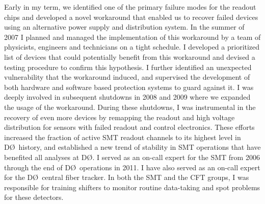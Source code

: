 \documentclass[amsmath,amssymb]{revtex4}
\def\dzero{D\O}
\begin{document}
Early in my term, we identified one of the primary failure modes for
the readout chips and developed a novel workaround that enabled us to
recover failed devices using an alternative power supply and
distribution system.  In the summer of 2007 I planned and managed the
implementation of this workaround by a team of physicists, engineers
and technicians on a tight schedule.  I developed a prioritized list
of devices that could potentially benefit from this workaround and
devised a testing procedure to confirm this hypothesis. I further
identified an unexpected vulnerability that the workaround induced,
and supervised the development of both hardware and software based
protection systems to guard against it.  I was deeply
involved in subsequent shutdowns in 2008 and 2009 where we expanded
the usage of the workaround.  During these shutdowns, I was
instrumental in the recovery of even more devices by remapping the
readout and high voltage distribution for sensors with failed readout
and control electronics.  These efforts increased the fraction of
active SMT readout channels to its highest level in \dzero~history,
and established a new trend of stability in SMT operations that have
benefited all analyses at \dzero.  I served as an on-call expert for
the SMT from 2006 through the end of \dzero~operations in 2011.  I
have also served as an on-call expert for the \dzero~central fiber
tracker.  In both the SMT and the CFT groups, I was responsible for
training shifters to monitor
routine data-taking and spot problems for these detectors.\\

%
\end{document}
